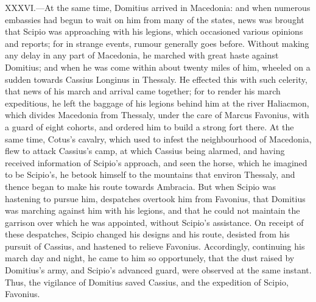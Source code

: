 XXXVI.—At the same time, Domitius arrived in Macedonia: and when
numerous embassies had begun to wait on him from many of the states,
news was brought that Scipio was approaching with his legions, which
occasioned various opinions and reports; for in strange events, rumour
generally goes before. Without making any delay in any part of
Macedonia, he marched with great haste against Domitius; and when he was
come within about twenty miles of him, wheeled on a sudden towards
Cassius Longinus in Thessaly. He effected this with such celerity, that
news of his march and arrival came together; for to render his march
expeditious, he left the baggage of his legions behind him at the river
Haliacmon, which divides Macedonia from Thessaly, under the care of
Marcus Favonius, with a guard of eight cohorts, and ordered him to build
a strong fort there. At the same time, Cotus's cavalry, which used to
infest the neighbourhood of Macedonia, flew to attack Cassius's camp, at
which Cassius being alarmed, and having received information of Scipio's
approach, and seen the horse, which he imagined to be Scipio's, he
betook himself to the mountains that environ Thessaly, and thence began
to make his route towards Ambracia. But when Scipio was hastening to
pursue him, despatches overtook him from Favonius, that Domitius was
marching against him with his legions, and that he could not maintain
the garrison over which he was appointed, without Scipio's assistance.
On receipt of these despatches, Scipio changed his designs and his
route, desisted from his pursuit of Cassius, and hastened to relieve
Favonius. Accordingly, continuing his march day and night, he came to
him so opportunely, that the dust raised by Domitius's army, and
Scipio's advanced guard, were observed at the same instant. Thus, the
vigilance of Domitius saved Cassius, and the expedition of Scipio,
Favonius.

